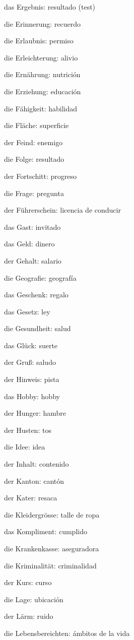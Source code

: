 \begin{multicols}{2}
\begin{myitemize}
\item das Ergebnis: resultado (test)
\item die Erinnerung: recuerdo
\item die Erlaubnis: permiso
\item die Erleichterung: alivio
\item die Ernährung: nutrición
\item die Erziehung: educación
\item die Fähigkeit: habilidad
\item die Fläche: superficie
\item der Feind: enemigo
\item die Folge: resultado
\item der Fortschitt: progreso
\item die Frage: pregunta
\item der Führerschein: licencia de conducir
\item das Gast: invitado
\item das Geld: dinero
\item der Gehalt: salario
\item die Geografie: geografía
\item das Geschenk: regalo
\item das Gesetz: ley
\item die Gesundheit: salud
\item das Glück: suerte
\item der Gruß: saludo
\item der Hinweis: pista
\item das Hobby: hobby
\item der Hunger: hambre
\item der Husten: tos
\item die Idee: idea
\item der Inhalt: contenido
\item der Kanton: cantón
\item der Kater: resaca
\item die Kleidergrösse: talle de ropa
\item das Kompliment: cumplido
\item die Krankenkasse: aseguradora
\item die Kriminalität: criminalidad
\item der Kurs: curso
\item die Lage: ubicación
\item der Lärm: ruido
\item die Lebensbereichten: ámbitos de la vida

\end{myitemize}
\end{multicols}
